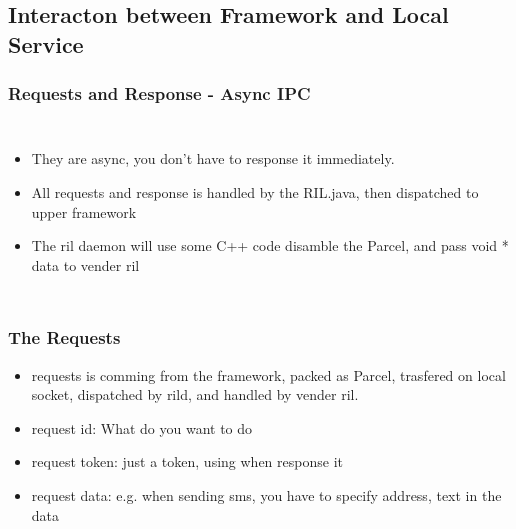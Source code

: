 \documentclass{beamer}
\begin{document}
\subsection{Interacton between Framework and Local Service}

\begin{frame}
    \frametitle{Requests and Response - Async IPC}
    \begin{columns}[c]
        \column{2in}
        \begin{itemize}
            \item They are async, you don't have to response it immediately.
            \item All requests and response is handled by the RIL.java, then dispatched to upper framework
            \item The ril daemon will use some C++ code disamble the Parcel, and pass void * data to vender ril
        \end{itemize}
        \column{2in}
    \end{columns}
\end{frame}
 
\begin{frame}
    \frametitle{The Requests}
    \begin{itemize}
        \item requests is comming from the framework, packed as Parcel, trasfered on local socket, dispatched by rild, and handled by vender ril.
        \item request id: What do you want to do
        \item request token: just a token, using when response it
        \item request data: e.g. when sending sms, you have to specify address, text in the data
    \end{itemize}
\end{frame}
\end{document}
